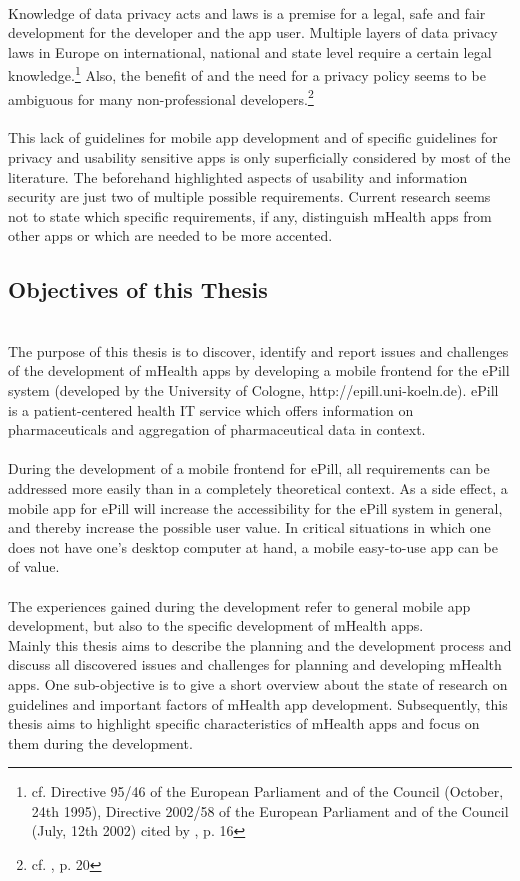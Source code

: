 \\
Knowledge of data privacy acts and laws is a premise for a legal, safe and fair development for the developer and the app user. Multiple layers of data privacy laws in Europe on international, national and state level require a certain legal knowledge.\footnote{cf. Directive 95/46 of the European Parliament and of the Council (October, 24th 1995), Directive 2002/58 of the European Parliament and of the Council (July, 12th 2002) cited by \cite{FutureofPrivacyForumCenterforDemocracy&Technology.2011}, p. 16} Also, the benefit of and the need for a privacy policy seems to be ambiguous for many non-professional developers.\footnote{cf. \cite{Njie.2013}, p. 20}
\\
\\
This lack of guidelines for mobile app development and of specific guidelines for privacy and usability sensitive apps is only superficially considered by most of the literature. The beforehand highlighted aspects of usability and information security are just two of multiple possible requirements. Current research seems not to state which specific requirements, if any, distinguish mHealth apps from other apps or which are needed to be more accented.

\subsection{Objectives of this Thesis}
\\
The purpose of this thesis is to discover, identify and report issues and challenges of the development of mHealth apps by developing a mobile frontend for the ePill system (developed by the University of Cologne, http://epill.uni-koeln.de). ePill is a patient-centered health IT service which offers information on pharmaceuticals and aggregation of pharmaceutical data in context.
\\
\\
During the development of a mobile frontend for ePill, all requirements can be addressed more easily than in a completely theoretical context. As a side effect, a mobile app for ePill will increase the accessibility for the ePill system in general, and thereby increase the possible user value. In critical situations in which one does not have one's desktop computer at hand, a mobile easy-to-use app can be of value.
\\
\\
The experiences gained during the development refer to general mobile app development, but also to the specific development of mHealth apps.
\\
Mainly this thesis aims to describe the planning and the development process and discuss all discovered issues and challenges for planning and developing mHealth apps. One sub-objective is to give a short overview about the state of research on guidelines and important factors of mHealth app development. Subsequently, this thesis aims to highlight specific characteristics of mHealth apps and focus on them during the development.